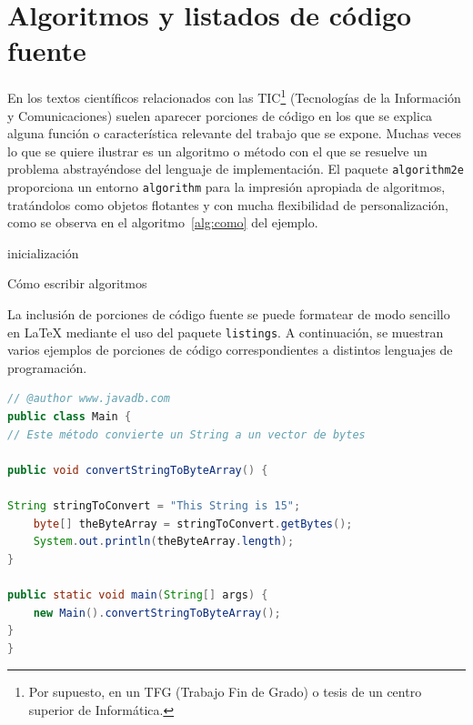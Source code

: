 \section{Algoritmos y listados de código fuente}
En los textos científicos relacionados con las 
TIC\footnote{Por supuesto, en un TFG (Trabajo Fin de Grado) o tesis 
de un centro superior de Informática.} (Tecnologías de la Información y 
Comunicaciones) suelen aparecer porciones de código en los que se explica 
alguna función o característica relevante del trabajo que se expone. Muchas 
veces lo que se quiere ilustrar es un algoritmo o método con el que se resuelve un problema abstrayéndose del lenguaje de implementación. El paquete \texttt{algorithm2e} proporciona un entorno \texttt{algorithm} para la impresión apropiada de algoritmos, tratándolos como objetos flotantes y con mucha flexibilidad de personalización, como se observa en el algoritmo~\ref{alg:como} del ejemplo.


\IncMargin{1em}
\begin{algorithm}
\LinesNumbered
\SetAlgoLined


inicialización\;

\caption{Cómo escribir algoritmos}\label{alg:como}
\end{algorithm}\DecMargin{1em}








\newpage %
La inclusión de porciones de código fuente se puede formatear de modo sencillo en \LaTeX{} mediante el uso del paquete \texttt{listings}. A continuación, se muestran varios ejemplos de porciones de código correspondientes a distintos lenguajes de programación.


\begin{lstlisting}[language=Java,caption={[Código fuente en Java]Ejemplo de código fuente en lenguaje Java},label=lst:java]
// @author www.javadb.com
public class Main {    
// Este método convierte un String a un vector de bytes

public void convertStringToByteArray() {

String stringToConvert = "This String is 15";      
	byte[] theByteArray = stringToConvert.getBytes();        
	System.out.println(theByteArray.length);        
}

public static void main(String[] args) {
	new Main().convertStringToByteArray();
}
}
\end{lstlisting}


